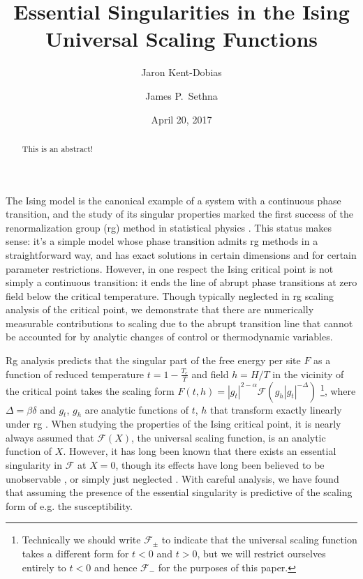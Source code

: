 \documentclass[aps,prl,reprint]{revtex4-1}
\begin{document}
\title{Essential Singularities in the Ising Universal Scaling Functions}
\author{Jaron Kent-Dobias}
\author{James P.~Sethna}

\date{April 20, 2017}

\begin{abstract}
  This is an abstract!
\end{abstract}

\maketitle

The Ising model is the canonical example of a system with a continuous phase
transition, and the study of its singular properties marked the first success
of the renormalization group ({\sc rg}) method in statistical physics
\cite{wilson.1971.renormalization}. This status makes sense: it's a simple
model whose phase transition admits {\sc rg} methods in a straightforward way,
and has exact solutions in certain dimensions and for certain parameter
restrictions. However, in one respect the Ising critical point is not simply a
continuous transition: it ends the line of abrupt phase transitions at zero
field below the critical temperature. Though typically neglected in {\sc rg}
scaling analysis of the critical point, we demonstrate that there are
numerically measurable contributions to scaling due to the abrupt transition
line that cannot be accounted for by analytic changes of control or
thermodynamic variables.

{\sc Rg} analysis predicts that the singular part of the free energy per site
$F$ as a function of reduced temperature $t=1-\frac{T_c}T$ and field $h=H/T$ in the vicinity of the critical point takes the scaling form
$F(t,h)=|g_t|^{2-\alpha}\mathcal F(g_h|g_t|^{-\Delta})$ \footnote{Technically we should write $\mathcal
  F_{\pm}$ to indicate that the universal scaling function takes a different
  form for $t<0$ and $t>0$, but we will restrict ourselves entirely to $t<0$
  and hence $\mathcal F_-$
for the purposes of this paper.}, where
$\Delta=\beta\delta$ and $g_t$, $g_h$ are analytic functions of $t$, $h$ that
transform exactly linearly under {\sc rg}
\cite{cardy.1996.scaling,aharony.1983.fields}. When studying the properties of the
Ising critical point, it is nearly always assumed that $\mathcal F(X)$, the
universal scaling function, is an analytic function of $X$. However, it has
long been known that there exists an essential singularity in $\mathcal F$ at
$X=0$, though its effects have long been believed to be unobservable
\cite{fisher.1967.condensation}, or
simply just neglected 
\cite{guida.1997.3dising,schofield.1969.parametric,schofield.1969.correlation,caselle.2001.critical,josephson.1969.equation,fisher.1999.trigonometric}. With careful analysis, we have found that
assuming the presence of the essential singularity is predictive of the
scaling form of e.g. the susceptibility.
\end{document}
